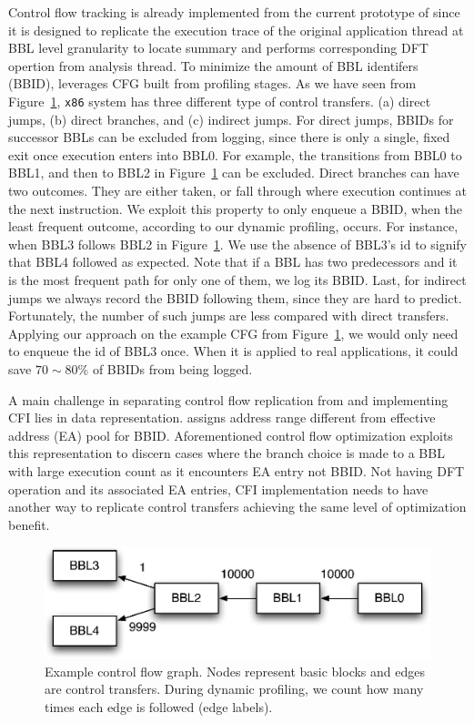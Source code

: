 Control flow tracking is already implemented from the current prototype of
\sreplica since it is designed to replicate the execution trace of the original
application thread at BBL level granularity to locate \tfa summary and performs
corresponding DFT opertion from analysis thread. To minimize the amount of BBL
identifers (BBID), \sreplica leverages CFG built from profiling stages.
%
As we have seen from Figure~\ref{fig:cfg0}, {\tt x86} system has three
different type of control transfers. (a) direct jumps, (b) direct branches, and
(c) indirect jumps. For direct jumps, BBIDs for successor BBLs can be excluded
from logging, since there is only a single, fixed exit once execution enters
into BBL0. For example, the transitions from BBL0 to BBL1, and then to BBL2 in
Figure~\ref{fig:cfg0} can be excluded. Direct branches can have two outcomes.
They are either taken, or fall through where execution continues at the next
instruction. We exploit this property to only enqueue a BBID, when the least
frequent outcome, according to our dynamic profiling, occurs. For instance,
when BBL3 follows BBL2 in Figure~\ref{fig:cfg0}. We use the absence of BBL3’s
id to signify that BBL4 followed as expected. Note that if a BBL has two
predecessors and it is the most frequent path for only one of them, we log its
BBID. Last, for indirect jumps we always record the BBID following them, since
they are hard to predict.  
%
Fortunately, the number of such jumps are less compared with direct transfers.
Applying our approach on the example CFG from Figure~\ref{fig:cfg0}, we would
only need to enqueue the id of BBL3 once. When it is applied to real
applications, it could save $70 \sim 80 \%$ of BBIDs from being logged.

A main challenge in separating control flow replication from \sreplica and
implementing CFI lies in data representation. \sreplica assigns address range
different from effective address (EA) pool for BBID. Aforementioned control
flow optimization exploits this representation to discern cases where the
branch choice is made to a BBL with large execution count as it encounters EA
entry not BBID.
%
Not having DFT operation and its associated EA entries, CFI implementation
needs to have another way to replicate control transfers achieving the same
level of optimization benefit.

\begin{figure}[tb]
    \centering
    \includegraphics[width=0.64\linewidth]{figs/cfg0.eps}
    \caption{Example control flow graph. Nodes represent basic blocks and edges
    are control transfers. During dynamic profiling, we count how many times
    each edge is followed (edge labels). \label{fig:cfg0}}
\end{figure}


